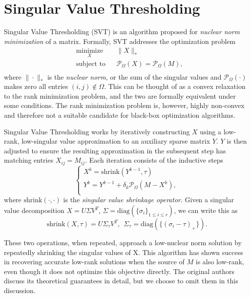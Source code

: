 \documentclass{article} %
\begin{document}
\section{Singular Value Thresholding}

Singular Value Thresholding (SVT) \cite{cai2010singular} is an
algorithm proposed for \emph{nuclear norm minimization} of a matrix.
Formally, SVT addresses the optimization problem
\begin{equation*}
\begin{aligned}
  & \underset{X}{\text{minimize}} & & \|X\|_{*} \\
  & \text{subject to}             & & \mathcal{P}_\Omega (X) =
  \mathcal{P}_\Omega (M), \\
\end{aligned}
\end{equation*}
where $\|\cdot\|_{*}$ is the \emph{nuclear norm}, or the sum of the
singular values and $\mathcal{P}_\Omega (\cdot)$ makes zero all
entries $(i, j) \notin \Omega$. This can be thought of as a convex
relaxation to the rank minimization problem, and the two are formally
equivalent under some conditions. The rank minimization problem is,
however, highly non-convex and therefore not a suitable candidate for
black-box optimization algorithms.

Singular Value Thresholding works by iteratively constructing $X$
using a low-rank, low-singular value approximation to an auxiliary
sparse matrix $Y$. $Y$ is then adjusted to ensure the resulting
approximation in the subsequent step has matching entries
$X_{ij} = M_{ij}$. Each iteration consists of the inductive steps
\begin{equation*}
\begin{cases}
X^{k} = \mathrm{shrink}(Y^{k-1}, \tau) \\
Y^{k} = Y^{k-1} + \delta_k \mathcal{P}_\Omega (M-X^{k}),              \\
\end{cases}
\end{equation*}
where $\mathrm{shrink}(\cdot, \cdot)$ is the \emph{singular value
  shrinkage operator}. Given a singular value decomposition $X = U
\Sigma V^T$, $\Sigma = \mathrm{diag}(\{\sigma_i\}_{1 \le i \le r})$, we
  can write this as
\begin{equation*}
\mathrm{shrink}(X, \tau) = U\Sigma_\tau V^T, \ \ \Sigma_\tau = \mathrm{diag}(\{(\sigma_i-\tau)_{+}\}).
\end{equation*} 


These two operations, when repeated, approach a low-nuclear norm
solution by repeatedly shrinking the singular values of X. This
algorithm has shown success in recovering accurate low-rank solutions
when the source of $M$ is also low-rank, even though it does not
optimize this objective directly. The original authors discuss its
theoretical guarantees in detail, but we choose to omit them in this
discussion.
\end{document}
